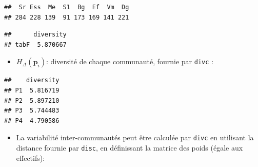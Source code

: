 \documentclass[
  11pt,
  french,
  a4paper,
  extrafontsizes,onecolumn,openright
  ]{memoir}
\newenvironment{Shaded}{\begin{snugshade}}{\end{snugshade}}
\newcommand{\DataTypeTok}[1]{\textcolor[rgb]{0.13,0.29,0.53}{#1}}
\newcommand{\DecValTok}[1]{\textcolor[rgb]{0.00,0.00,0.81}{#1}}
\newcommand{\KeywordTok}[1]{\textcolor[rgb]{0.13,0.29,0.53}{\textbf{#1}}}
\newcommand{\NormalTok}[1]{#1}
\newcommand{\OperatorTok}[1]{\textcolor[rgb]{0.81,0.36,0.00}{\textbf{#1}}}
\newcommand{\StringTok}[1]{\textcolor[rgb]{0.31,0.60,0.02}{#1}}
\providecommand{\tightlist}{%
  \setlength{\itemsep}{0pt}\setlength{\parskip}{0pt}}
\begin{document}
\scriptsize

\begin{Shaded}
\end{Shaded}

\begin{verbatim}
##  Sr Ess  Me  S1  Bg  Ef  Vm  Dg 
## 284 228 139  91 173 169 141 221
\end{verbatim}

\begin{Shaded}
\end{Shaded}

\begin{verbatim}
##      diversity
## tabF  5.870667
\end{verbatim}

\normalsize

\begin{itemize}
\tightlist
\item
  \(H_{\Delta}\left({\mathbf{p}}_i\right)\): diversité de chaque communauté, fournie par \texttt{divc} :
\end{itemize}

\scriptsize

\begin{Shaded}
\end{Shaded}

\begin{verbatim}
##    diversity
## P1  5.816719
## P2  5.897210
## P3  5.744483
## P4  4.790586
\end{verbatim}

\normalsize

\begin{itemize}
\tightlist
\item
  La variabilité inter-communautés peut être calculée par \texttt{divc} en utilisant la distance fournie par \texttt{disc}, en définissant la matrice des poids (égale aux effectifs):
\end{itemize}
\end{document}
